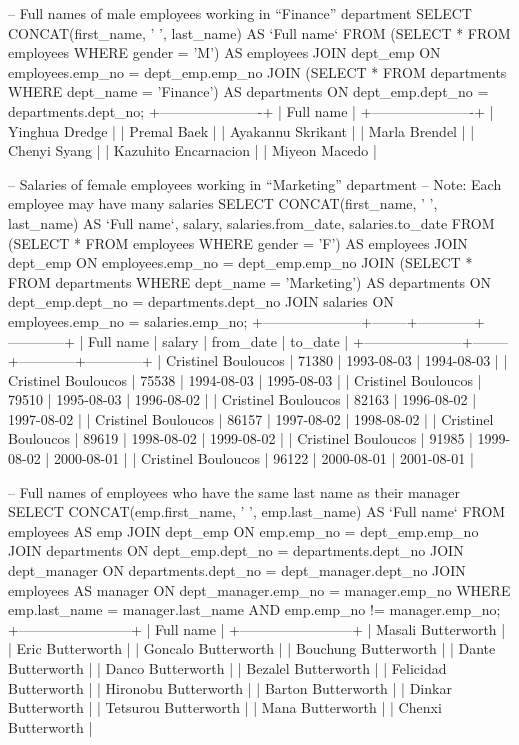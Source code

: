 -- Full names of male employees working in “Finance” department
SELECT 
    CONCAT(first_name, ' ', last_name) AS `Full name`
FROM
    (SELECT * FROM employees WHERE gender = 'M') AS employees
        JOIN
    dept_emp ON employees.emp_no = dept_emp.emp_no
        JOIN
    (SELECT * FROM departments WHERE dept_name = 'Finance') AS departments  ON dept_emp.dept_no = departments.dept_no;
+----------------------+
| Full name            |
+----------------------+
| Yinghua Dredge       |
| Premal Baek          |
| Ayakannu Skrikant    |
| Marla Brendel        |
| Chenyi Syang         |
| Kazuhito Encarnacion |
| Miyeon Macedo        |
    
-- Salaries of female employees working in “Marketing” department
-- Note: Each employee may have many salaries
SELECT 
    CONCAT(first_name, ' ', last_name) AS `Full name`, salary, salaries.from_date, salaries.to_date
FROM
    (SELECT * FROM employees WHERE gender = 'F') AS employees 
        JOIN
    dept_emp ON employees.emp_no = dept_emp.emp_no
        JOIN
    (SELECT * FROM departments WHERE dept_name = 'Marketing') AS departments ON dept_emp.dept_no = departments.dept_no
         JOIN
	salaries ON employees.emp_no = salaries.emp_no;
+---------------------+--------+------------+------------+
| Full name           | salary | from_date  | to_date    |
+---------------------+--------+------------+------------+
| Cristinel Bouloucos |  71380 | 1993-08-03 | 1994-08-03 |
| Cristinel Bouloucos |  75538 | 1994-08-03 | 1995-08-03 |
| Cristinel Bouloucos |  79510 | 1995-08-03 | 1996-08-02 |
| Cristinel Bouloucos |  82163 | 1996-08-02 | 1997-08-02 |
| Cristinel Bouloucos |  86157 | 1997-08-02 | 1998-08-02 |
| Cristinel Bouloucos |  89619 | 1998-08-02 | 1999-08-02 |
| Cristinel Bouloucos |  91985 | 1999-08-02 | 2000-08-01 |
| Cristinel Bouloucos |  96122 | 2000-08-01 | 2001-08-01 |
    
-- Full names of employees who have the same last name as their manager
SELECT 
    CONCAT(emp.first_name, ' ', emp.last_name) AS `Full name`
FROM
    employees AS emp
        JOIN
    dept_emp ON emp.emp_no = dept_emp.emp_no
        JOIN
    departments ON dept_emp.dept_no = departments.dept_no
        JOIN
    dept_manager ON departments.dept_no = dept_manager.dept_no
        JOIN
    employees AS manager ON dept_manager.emp_no = manager.emp_no
WHERE
    emp.last_name = manager.last_name
        AND emp.emp_no != manager.emp_no;
+------------------------+
| Full name              |
+------------------------+
| Masali Butterworth     |
| Eric Butterworth       |
| Goncalo Butterworth    |
| Bouchung Butterworth   |
| Dante Butterworth      |
| Danco Butterworth      |
| Bezalel Butterworth    |
| Felicidad Butterworth  |
| Hironobu Butterworth   |
| Barton Butterworth     |
| Dinkar Butterworth     |
| Tetsurou Butterworth   |
| Mana Butterworth       |
| Chenxi Butterworth     |

